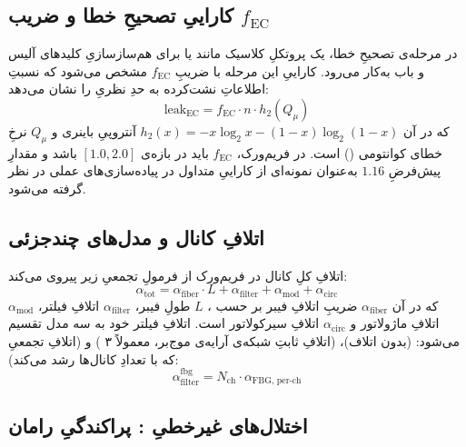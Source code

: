 \subsection{\texorpdfstring{کاراییِ تصحیحِ خطا و ضریب $f_{\text{EC}}$}{کارایی تصحیح خطا و ضریب f-EC}}

در مرحله‌ی تصحیحِ خطا، یک پروتکلِ کلاسیک مانند  یا  برای هم‌سازسازیِ کلیدهای آلیس و باب به‌کار می‌رود. کاراییِ این مرحله با ضریبِ $f_{\text{EC}}$ مشخص می‌شود که نسبتِ اطلاعاتِ نشت‌کرده به حدِ نظریِ  را نشان می‌دهد:
\begin{equation}
	\text{leak}_{\text{EC}} = f_{\text{EC}} \cdot n \cdot h_2(Q_{\mu})
\end{equation}
که در آن $h_2(x) = -x \log_2 x - (1-x) \log_2(1-x)$ آنتروپیِ باینری و $Q_{\mu}$ نرخِ خطای کوانتومی () است. در فریم‌ورک، $f_{\text{EC}}$ باید در بازه‌ی $[1.0, 2.0]$ باشد و مقدارِ پیش‌فرضِ $1.16$ به‌عنوان نمونه‌ای از کاراییِ متداول در پیاده‌سازی‌های عملی در نظر گرفته می‌شود.

\subsection{اتلافِ کانال و مدل‌های چند‌جزئی}

اتلافِ کلِ کانال در فریم‌ورک از فرمولِ تجمعیِ زیر پیروی می‌کند:
\begin{equation}
	\alpha_{\text{tot}} = \alpha_{\text{fiber}} \cdot L + \alpha_{\text{filter}} + \alpha_{\text{mod}} + \alpha_{\text{circ}}
\end{equation}
که در آن $\alpha_{\text{fiber}}$ ضریبِ اتلافِ فیبر بر حسب ، $L$ طولِ فیبر، $\alpha_{\text{filter}}$ اتلافِ فیلتر، $\alpha_{\text{mod}}$ اتلافِ ماژولاتور و $\alpha_{\text{circ}}$ اتلافِ سیرکولاتور است. اتلافِ فیلتر خود به سه مدل تقسیم می‌شود:  (بدون اتلاف)،  (اتلافِ ثابتِ شبکه‌ی آرایه‌ی موج‌بر، معمولاً ۳ ) و  (اتلافِ تجمعیِ  که با تعدادِ کانال‌ها رشد می‌کند):
\begin{equation}
	\alpha_{\text{filter}}^{\text{fbg}} = N_{\text{ch}} \cdot \alpha_{\text{FBG, per-ch}}
\end{equation}

\subsection{اختلال‌های غیرخطیِ : پراکندگیِ رامان}

